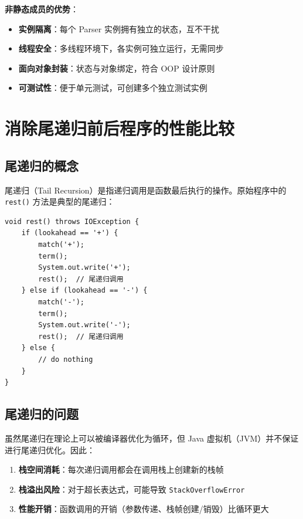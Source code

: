 \documentclass[a4paper]{article}
\begin{document}
\textbf{非静态成员的优势}：
\begin{itemize}
    \item \textbf{实例隔离}：每个 Parser 实例拥有独立的状态，互不干扰
    \item \textbf{线程安全}：多线程环境下，各实例可独立运行，无需同步
    \item \textbf{面向对象封装}：状态与对象绑定，符合 OOP 设计原则
    \item \textbf{可测试性}：便于单元测试，可创建多个独立测试实例
\end{itemize}

\section{消除尾递归前后程序的性能比较}

\subsection{尾递归的概念}

尾递归（Tail Recursion）是指递归调用是函数最后执行的操作。原始程序中的 \texttt{rest()} 方法是典型的尾递归：

\begin{lstlisting}[caption={原始尾递归版本的 rest() 方法}]
void rest() throws IOException {
    if (lookahead == '+') {
        match('+');
        term();
        System.out.write('+');
        rest();  // 尾递归调用
    } else if (lookahead == '-') {
        match('-');
        term();
        System.out.write('-');
        rest();  // 尾递归调用
    } else {
        // do nothing
    }
}
\end{lstlisting}

\subsection{尾递归的问题}

虽然尾递归在理论上可以被编译器优化为循环，但 Java 虚拟机（JVM）并不保证进行尾递归优化。因此：
\begin{enumerate}
    \item \textbf{栈空间消耗}：每次递归调用都会在调用栈上创建新的栈帧
    \item \textbf{栈溢出风险}：对于超长表达式，可能导致 \texttt{StackOverflowError}
    \item \textbf{性能开销}：函数调用的开销（参数传递、栈帧创建/销毁）比循环更大
\end{enumerate}
\end{document}
